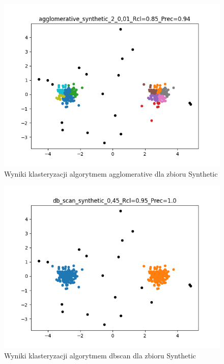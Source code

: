 \documentclass{classrep}
\begin{document}
{{            \begin{figure}[!htbp]
                \centering
                \includegraphics[width=\textwidth]{img/agglomerative_synthetic_2_0,01_-115720.png}
                \caption
                {Wyniki klasteryzacji algorytmem agglomerative dla zbioru Synthetic}
                \label{fig:synth_agglomerative}
            \end{figure}

            \begin{figure}[!htbp]
                \centering
                \includegraphics[width=\textwidth]{img/db_scan_synthetic_0,45_-115726.png}
                \caption
                {Wyniki klasteryzacji algorytmem dbscan dla zbioru Synthetic}
                \label{fig:synth_dbscan}
            \end{figure}

}}
\end{document}

